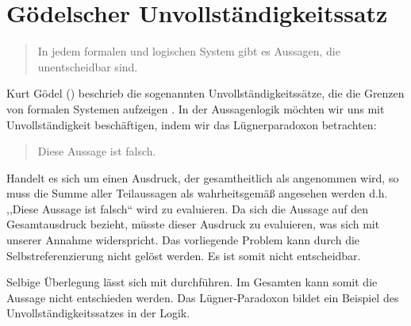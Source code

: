 \section{Gödelscher Unvollständigkeitssatz}
%
\begin{quote}
  In jedem formalen und logischen System gibt es Aussagen, die unentscheidbar sind.
\end{quote}
%
Kurt Gödel () beschrieb die sogenannten Unvollständigkeitssätze, die die Grenzen von formalen Systemen aufzeigen \cite{GoedelUnvS}.
In der Aussagenlogik möchten wir uns mit Unvollständigkeit beschäftigen, indem wir das Lügnerparadoxon betrachten:
%
\begin{quote}
  Diese Aussage ist falsch.
\end{quote}
%
Handelt es sich um einen Ausdruck, der gesamtheitlich als \T{} angenommen wird, so muss die Summe aller Teilaussagen als wahrheitsgemäß angesehen werden d.h. ,,Diese Aussage ist falsch`` wird zu \T{} evaluieren. Da sich die Aussage auf den Gesamtausdruck bezieht, müsste dieser Ausdruck zu \F{} evaluieren, was sich mit unserer Annahme widerspricht. Das vorliegende Problem kann durch die Selbstreferenzierung nicht gelöst werden. Es ist somit nicht entscheidbar.

Selbige Überlegung lässt sich mit \F{} durchführen. Im Gesamten kann somit die Aussage nicht entschieden werden. Das Lügner-Paradoxon bildet ein Beispiel des Unvollständigkeitssatzes in der Logik.
